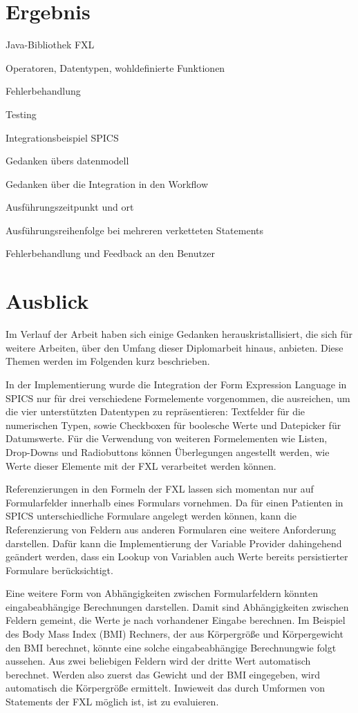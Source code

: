 
\chapter{Ergebnis}
\label{chapter_ergebnis}


Java-Bibliothek FXL

Operatoren, Datentypen, wohldefinierte Funktionen

Fehlerbehandlung

Testing

Integrationsbeispiel SPICS

Gedanken übers datenmodell

Gedanken über die Integration in den Workflow

Ausführungszeitpunkt und ort

Ausführungsreihenfolge bei mehreren verketteten Statements

Fehlerbehandlung und Feedback an den Benutzer

\chapter{Ausblick}
\label{chapter_ausblick}

Im Verlauf der Arbeit haben sich einige Gedanken herauskristallisiert, die sich für weitere Arbeiten, über den Umfang dieser Diplomarbeit hinaus, anbieten. Diese  Themen werden im Folgenden kurz beschrieben. 

In der Implementierung wurde die Integration der Form Expression Language in SPICS nur für drei verschiedene Formelemente vorgenommen, die ausreichen, um die vier unterstützten Datentypen zu repräsentieren: Textfelder für die numerischen Typen, sowie Checkboxen für boolesche Werte und Datepicker für Datumswerte. Für die Verwendung von weiteren Formelementen wie Listen, Drop-Downs und Radiobuttons können Überlegungen angestellt werden, wie Werte dieser Elemente mit der FXL verarbeitet werden können.

Referenzierungen in den Formeln der FXL lassen sich momentan nur auf Formularfelder innerhalb eines Formulars vornehmen. Da für einen Patienten in SPICS unterschiedliche Formulare angelegt werden können, kann die Referenzierung von Feldern aus anderen Formularen eine weitere Anforderung darstellen. Dafür kann die Implementierung der Variable Provider dahingehend geändert werden, dass ein Lookup von Variablen auch Werte bereits persistierter Formulare berücksichtigt. 

Eine weitere Form von Abhängigkeiten zwischen Formularfeldern könnten eingabeabhängige Berechnungen darstellen. Damit sind Abhängigkeiten zwischen Feldern gemeint, die Werte je nach vorhandener Eingabe berechnen. Im Beispiel des Body Mass Index (BMI) Rechners, der aus Körpergröße und Körpergewicht den BMI berechnet, könnte eine solche eingabeabhängige Berechnungwie folgt aussehen. Aus zwei beliebigen Feldern wird der dritte Wert automatisch berechnet. Werden also zuerst das Gewicht und der BMI eingegeben, wird automatisch die Körpergröße ermittelt. Inwieweit das durch Umformen von Statements der FXL möglich ist, ist zu evaluieren.

